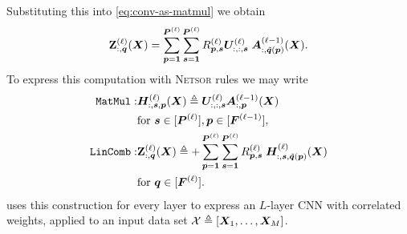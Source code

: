 \documentclass[accepted]{uai2021} %
\newcommand{\Netsor}{\textsc{Netsor}\xspace}
\newcommand{\LinComb}{\texttt{LinComb}\xspace}
\newcommand{\layera}[2]{\mathbf{Z}^{(#1)}_{#2}(\mX)}
\newcommand{\layernla}[2]{\vA^{(#1)}_{#2}(\mX)}
\newcommand{\layerU}[1]{\vU^{(#1)}}
\newcommand{\layersizebase}{\vF}
\newcommand{\layersize}[1]{{\layersizebase^{\bra{#1}}}}
\newcommand{\patchsizebase}{\vP}
\newcommand{\patchsize}[1]{{\patchsizebase^{\bra{#1}}}}
\newcommand{\patchf}[2]{{\tilde#1\bra{#2}}}
\newcommand{\patch}{\vp}               %
\newcommand{\nextpatch}{\vq}
\newcommand{\0}{\boldsymbol{0}}
\newcommand{\1}{\boldsymbol{1}}
\begin{document}
Substituting this into \cref{eq:conv-as-matmul} we obtain
\begin{equation}
\layera{\ell}{:,\nextpatch} = \sum_{\patch=\1}^{\patchsize{\ell}} \sum_{\vs=\1}^{\patchsize{\ell}}R\ssup{\ell}_{\patch,\vs}\layerU{\ell}_{:,:,\vs} \; \layernla{\ell-1}{:,\patchf{\nextpatch}{\patch}}.
\label{eq:correlated-conv-as-matmul}
\end{equation}
To express this computation with \Netsor rules we may write
\begin{align}
  \texttt{MatMul}:& \mH\ssup{\ell}_{:,\vs,\patch}\bra{\mX} \eqdef \layerU{\ell}_{:,:,\vs}\layernla{\ell-1}{:,\patch} \nonumber\\
  &\text{for }\vs\in \countto{\patchsize{\ell}},\patch \in \countto{\layersize{\ell-1}}, \label{eq:cnn-corr-matmul} \\
  \LinComb:& \layera{\ell}{:,\nextpatch} \eqdef +
\sum_{\patch=\1}^{\patchsize{\ell}} \sum_{\vs=\1}^{\patchsize{\ell}}
R\ssup{\ell}_{\patch,\vs}\;
\mH\ssup{\ell}_{:,\vs,\patchf{\nextpatch}{\patch}}\bra{\mX}  \nonumber\\
  &\text{for }\nextpatch\in \countto{\layersize{\ell}}.
\label{eq:cnn-corr-lincomb}
\end{align}
 uses this construction for every layer to express an
$L$-layer \ac{CNN} with correlated weights, applied to an input data set
${\mathcal{X}}\triangleq{\left[ {\bm{X}}_{1},\dots,{\bm{X}}_{M} \right]}$.
\end{document}
